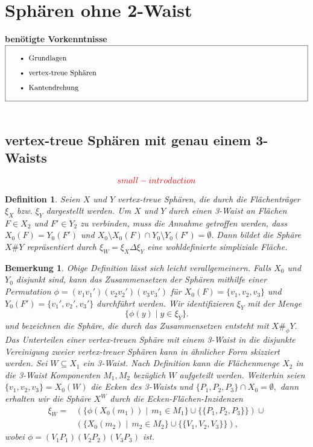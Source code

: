 \documentclass[12pt,titlepage,twoside,cleardoublepage]{article}
\theoremstyle{nummermitklammern}
\newtheorem{definition}[temp]{Definition}
\newtheorem{bemerkung}[temp]{Bemerkung}
\newtheorem{definition}[zahl]{Definition}
\newtheorem{bemerkung}[zahl]{Bemerkung}
\numberwithin{equation}{section}
\begin{document}
 \section{Sphären ohne 2-Waist}
 \textbf{benötigte Vorkenntnisse}\\
$\fbox{
\parbox{14cm}{\begin{itemize}
\item Grundlagen 
\item vertex-treue Sph\"aren
\item Kantendrehung
\end{itemize}
}}$\\\\

\subsection{vertex-treue Sphären mit genau einem 3-Waists}
\[
\textcolor{red}{small-introduction}
\]
\begin{definition}
Seien $X$ und $Y$ vertex-treue Sphären, die durch die Flächenträger $\xi_X$ bzw. $\xi_Y$ dargestellt werden. Um $X$ und $Y$ durch einen 3-Waist an Flächen $F\in X_2$ und $F'\in Y_2$ zu verbinden, muss die Annahme getroffen werden, dass
$X_0(F)=Y_0(F')$ und $X_0\setminus X_0(F)\cap Y_0\setminus Y_0(F')=\emptyset.$ Dann bildet die Sphäre $X\#Y$ repräsentiert durch $\xi_W=\xi_X \Delta \xi_Y$ eine wohldefinierte simpliziale Fläche.
\end{definition}
\begin{bemerkung}\label{3waist}
Obige Definition lässt sich leicht verallgemeinern. Falls $X_0$ und $Y_0$ disjunkt sind, kann das Zusammensetzen der Sphären mithilfe einer Permutation $\phi=(v_1v_1')(v_2v_2')(v_3v_3')$ für $X_0(F)=\{v_1,v_2,v_3\}$ und $Y_0(F')=\{v_1',v_2',v_3'\}$ durchführt werden. Wir identifizieren $\xi_Y$ mit der Menge  
\[
\{\phi (y)\mid y\in \xi_Y \}.
\]
und bezeichnen die Sphäre, die durch das Zusammensetzen  entsteht mit $X\#_{\phi}Y.$\\
Das Unterteilen einer vertex-treuen Sphäre mit einem 3-Waist in die disjunkte Vereinigung zweier vertex-treuer Sphären kann in ähnlicher Form skizziert werden. Sei $W\subseteq X_1$ ein 3-Waist. Nach Definition  kann die Flächenmenge $X_2$ in die 3-Waist Komponenten $M_1,M_2$ bezüglich $W$ aufgeteilt werden. Weiterhin seien $\{v_1,v_2,v_3\}=X_0(W)$ die Ecken des 3-Waists und $\{P_1,P_2,P_3\}\cap X_0=\emptyset,$ dann erhalten wir die Sphäre $X^W$ durch die Ecken-Flächen-Inzidenzen 
\begin{align*}
\xi_W=&(\{\phi(X_0(m_1))\mid \, m_1\in M_1\}\cup \{\{P_1,P_2,P_3\}\}) \cup\\
 &(\{X_0(m_2)\mid \, m_2\in M_2\}\cup \{\{V_1,V_2,V_3\}\}),
\end{align*}
wobei $\phi=(V_1P_1)(V_2P_2)(V_3P_3)$ ist.
\end{bemerkung}
\end{document}
